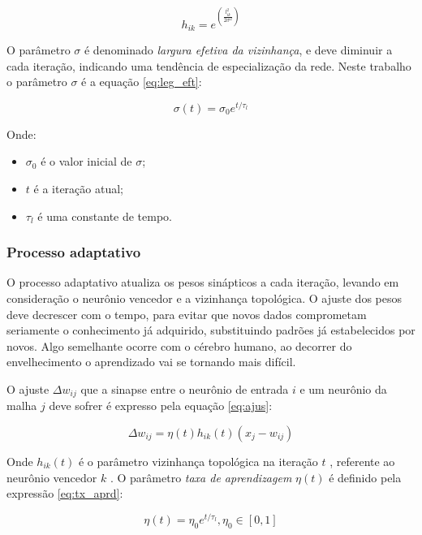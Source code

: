 \begin{equation}\label{eq:gauss}
h_{ik} = e^{ \left( \frac{ l_{ik}^2 }{ 2 \sigma^2 } \right) }
\end{equation}

O parâmetro $ \sigma $ é denominado \textit{largura efetiva da vizinhança},
e deve diminuir a cada iteração, indicando uma tendência de especialização da
rede. Neste trabalho o parâmetro $ \sigma $ é a equação \ref{eq:leg_eft}:

\begin{equation}\label{eq:leg_eft}
\sigma(t) = \sigma_0 e^{ t / \tau_l }
\end{equation}

Onde:

\begin{itemize}
\item $ \sigma_0 $ é o valor inicial de $ \sigma $;
\item $ t $ é a iteração atual;
\item $ \tau_l $ é uma constante de tempo.
\end{itemize}

\subsubsection{Processo adaptativo}

O processo adaptativo atualiza os pesos sinápticos a cada iteração, levando em
consideração o neurônio vencedor e a vizinhança topológica. O ajuste dos pesos
deve decrescer com o tempo, para evitar que novos dados comprometam seriamente
o conhecimento já adquirido, substituindo padrões já estabelecidos por novos.
Algo semelhante ocorre com o cérebro humano, ao decorrer do envelhecimento o
aprendizado vai se tornando mais difícil.

O ajuste $ \Delta w_{ij} $ que a sinapse entre o neurônio de entrada $ i $ e
um neurônio da malha $ j $ deve sofrer é expresso pela equação \ref{eq:ajus}:

\begin{equation}\label{eq:ajus}
\Delta w_{ij} = \eta(t) h_{ik}(t) (x_j - w_{ij})
\end{equation}

Onde $ h_{ik}(t) $ é o parâmetro vizinhança topológica na iteração $ t $ ,
referente ao neurônio vencedor $ k $ . O
parâmetro \textit{taxa de aprendizagem} $ \eta(t) $ é definido pela
expressão \ref{eq:tx_aprd}:

\begin{equation}\label{eq:tx_aprd}
  \eta(t) = \eta_0 e^{ t / \tau_l }, \eta_0 \in [0, 1]
\end{equation}

